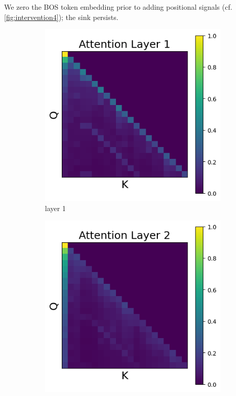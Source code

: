 \documentclass[11pt]{article}
\begin{document}
We zero the BOS token embedding prior to adding positional signals (cf. \cref{fig:intervention4}); the sink persists.
\begin{figure}[t]
  \begin{subfigure}[t]{0.24\textwidth}
    \centering
    \includegraphics[width=1.4\columnwidth]{figures/intervention4/layer_1.png}
    \caption{layer 1}
  \end{subfigure}\hfill
  \begin{subfigure}[t]{0.24\textwidth}
    \centering
    \includegraphics[width=1.4\columnwidth]{figures/intervention4/layer_2.png}

\end{subfigure}
\end{figure}
\end{document}
